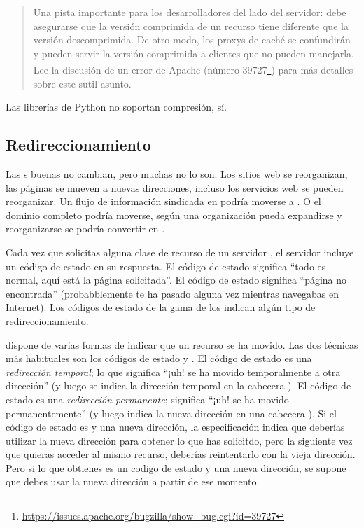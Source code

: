 \begin{quote}
Una pista importante para los desarrolladores del lado del servidor: debe asegurarse que la versión comprimida de un recurso tiene diferente  que la versión descomprimida. De otro modo, los proxys de caché se confundirán y pueden servir la versión comprimida a clientes que no pueden manejarla. Lee la discusión de un error de Apache (número 39727\footnote{\href{https://issues.apache.org/bugzilla/show\_bug.cgi?id=39727}{https://issues.apache.org/bugzilla/show\_bug.cgi?id=39727}}) para más detalles sobre este sutil asunto.
\end{quote}

Las librerías  de Python no soportan compresión,  sí.

\subsection{Redireccionamiento}


Las s buenas no cambian, pero muchas no lo son. Los sitios web se reorganizan, las páginas se mueven a nuevas direcciones, incluso los servicios web se pueden reorganizar. Un flujo de información sindicada en  podría moverse a . O el dominio completo podría moverse, según una organización pueda expandirse y reorganizarse  se podría convertir en .

Cada vez que solicitas alguna clase de recurso de un servidor , el servidor incluye un código de estado en su respuesta. El código de estado  significa ``todo es normal, aquí está la página solicitada''. El código de estado  significa ``página no encontrada'' (probabblemente te ha pasado alguna vez mientras navegabas en Internet). Los códigos de estado de la gama de los  indican algún tipo de redireccionamiento.


 dispone de varias formas de indicar que un recurso se ha movido. Las dos técnicas más habituales son los códigos de estado  y . El código de estado  es una \emph{redirección temporal}; lo que significa ``¡uh! se ha movido temporalmente a otra dirección'' (y luego se indica la dirección temporal en la cabecera ). El código de estado  es una \emph{redirección permanente}; significa ``¡uh! se ha movido permanentemente'' (y luego indica la nueva dirección en una cabecera ). Si el código de estado es  y una nueva dirección, la especificación  indica que deberías utilizar la nueva dirección para obtener lo que has solicitdo, pero la siguiente vez que quieras acceder al mismo recurso, deberías reintentarlo con la vieja dirección. Pero si lo que obtienes es un codigo de estado  y una nueva dirección, se supone que debes usar la nueva dirección a partir de ese momento.

